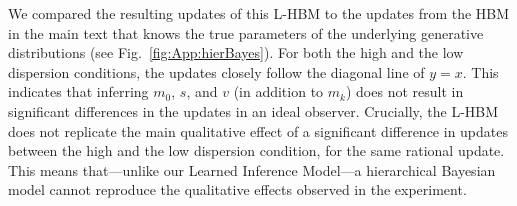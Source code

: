 
We compared the resulting updates of this L-HBM to the updates from the HBM in the main text that knows the true parameters of the underlying generative distributions (see Fig.~\ref{fig:App:hierBayes}). For both the high and the low dispersion conditions, the updates closely follow the diagonal line of $y=x$. This indicates that inferring $m_0$, $s$, and $v$ (in addition to $m_k$) does not result in significant differences in the updates in an ideal observer. Crucially, the L-HBM does not replicate the main qualitative effect of a significant difference in updates between the high and the low dispersion condition, for the same rational update. This means that---unlike our Learned Inference Model---a hierarchical Bayesian model cannot reproduce the qualitative effects observed in the experiment.
